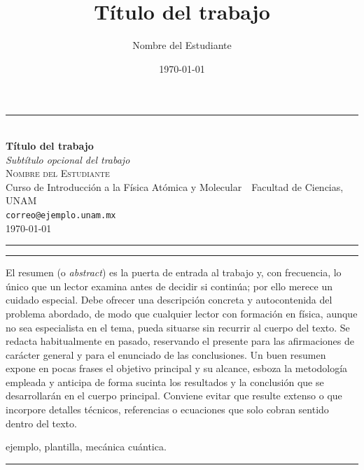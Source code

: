 \documentclass[11pt,letterpaper]{article}
\title{Título del trabajo}
\author{Nombre del Estudiante}
\date{\today}
\newcommand{\subtitulo}{Subtítulo opcional del trabajo}
\begin{document}
\begin{center}
  {\color{ocre}\rule{0.5\textwidth}{0.8pt}}\\[1.1em]
  {\LARGE\bfseries\color{navaMidnight} Título del trabajo}\\[0.45em]
  {\large\itshape \subtitulo}\\[1.2em]
  {\scshape\large Nombre del Estudiante}\\[0.35em]
  {\small Curso de Introducción a la Física Atómica y Molecular\ \textperiodcentered\ Facultad de Ciencias, UNAM\\
   \texttt{correo@ejemplo.unam.mx}}\\[0.5em]
  {\small \today}\\[0.6em]
  {\color{ocre}\rule{0.5\textwidth}{0.8pt}}
\end{center}
\vspace{0.6em}

\begin{center}
\begin{minipage}{0.88\textwidth}
  {\color{adobe}\rule{\linewidth}{0.6pt}}\par\vspace{0.6em}
  \small
  El resumen (o \textit{abstract}) es la puerta de entrada al trabajo y, con
  frecuencia, lo único que un lector examina antes de decidir si continúa; por
  ello merece un cuidado especial. Debe ofrecer una descripción concreta y
  autocontenida del problema abordado, de modo que cualquier lector con
  formación en física, aunque no sea especialista en el tema, pueda situarse sin
  recurrir al cuerpo del texto. Se redacta habitualmente en pasado, reservando el
  presente para las afirmaciones de carácter general y para el enunciado de las
  conclusiones. Un buen resumen expone en pocas frases el objetivo principal y su
  alcance, esboza la metodología empleada y anticipa de forma sucinta los
  resultados y la conclusión que se desarrollarán en el cuerpo principal. Conviene
  evitar que resulte extenso o que incorpore detalles técnicos, referencias o
  ecuaciones que solo cobran sentido dentro del texto.
  \par\vspace{0.7em}
   ejemplo, plantilla, mecánica
  cuántica.
  \par\vspace{0.6em}
  {\color{adobe}\rule{\linewidth}{0.6pt}}
\end{minipage}
\end{center}
\vspace{1.2em}
\end{document}
